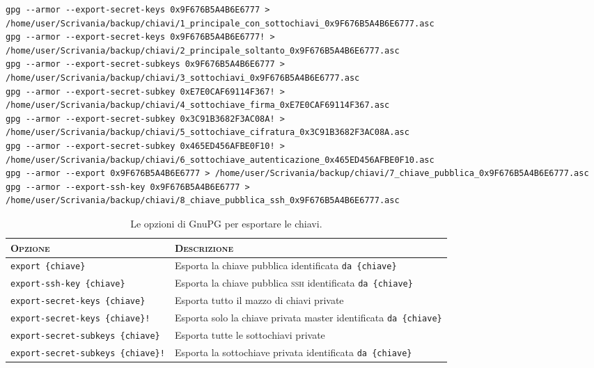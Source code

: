 \begin{lstlisting}
gpg --armor --export-secret-keys 0x9F676B5A4B6E6777 > /home/user/Scrivania/backup/chiavi/1_principale_con_sottochiavi_0x9F676B5A4B6E6777.asc
gpg --armor --export-secret-keys 0x9F676B5A4B6E6777! > /home/user/Scrivania/backup/chiavi/2_principale_soltanto_0x9F676B5A4B6E6777.asc
gpg --armor --export-secret-subkeys 0x9F676B5A4B6E6777 > /home/user/Scrivania/backup/chiavi/3_sottochiavi_0x9F676B5A4B6E6777.asc
gpg --armor --export-secret-subkey 0xE7E0CAF69114F367! > /home/user/Scrivania/backup/chiavi/4_sottochiave_firma_0xE7E0CAF69114F367.asc
gpg --armor --export-secret-subkey 0x3C91B3682F3AC08A! > /home/user/Scrivania/backup/chiavi/5_sottochiave_cifratura_0x3C91B3682F3AC08A.asc
gpg --armor --export-secret-subkey 0x465ED456AFBE0F10! > /home/user/Scrivania/backup/chiavi/6_sottochiave_autenticazione_0x465ED456AFBE0F10.asc
gpg --armor --export 0x9F676B5A4B6E6777 > /home/user/Scrivania/backup/chiavi/7_chiave_pubblica_0x9F676B5A4B6E6777.asc
gpg --armor --export-ssh-key 0x9F676B5A4B6E6777 > /home/user/Scrivania/backup/chiavi/8_chiave_pubblica_ssh_0x9F676B5A4B6E6777.asc
\end{lstlisting}

\begin{table}
    \centering
	\begin{tabularx}{\textwidth}{l p{5cm}}
 		\toprule
		\textsc{Opzione} & \textsc{Descrizione} \\
		\midrule
		\texttt{export \{chiave\}}                 & Esporta la chiave pubblica identificata \texttt{da \{chiave\}}              \\
		\texttt{export-ssh-key \{chiave\}}         & Esporta la chiave pubblica \textsc{ssh} identificata \texttt{da \{chiave\}} \\
		\texttt{export-secret-keys \{chiave\}}     & Esporta tutto il mazzo di chiavi private                                    \\
		\texttt{export-secret-keys \{chiave\}!}    & Esporta solo la chiave privata master identificata \texttt{da \{chiave\}}   \\
		\texttt{export-secret-subkeys \{chiave\}}  & Esporta tutte le sottochiavi private                                        \\
		\texttt{export-secret-subkeys \{chiave\}!} & Esporta la sottochiave privata identificata \texttt{da \{chiave\}}          \\
		\bottomrule
	\end{tabularx}
	\caption{Le opzioni di GnuPG per esportare le chiavi.}
	\label{table:exportkeys}
\end{table}

